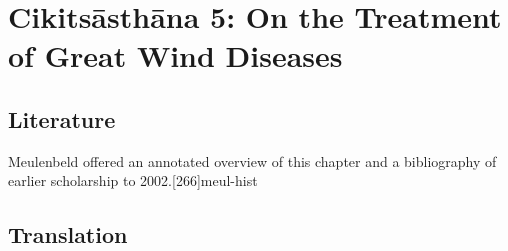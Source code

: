 
\chapter{Cikitsāsthāna 5:  On the Treatment of Great Wind Diseases}

\section{Literature}

Meulenbeld offered an annotated overview of this chapter and a bibliography
of earlier scholarship to 2002.[266]{meul-hist}

\section{Translation}

